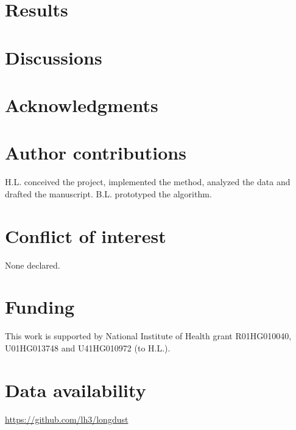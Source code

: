 \documentclass[webpdf,contemporary,large,namedate]{oup-authoring-template}%
\begin{document}
\section{Results}

\section{Discussions}

\section*{Acknowledgments}

\section*{Author contributions}

H.L. conceived the project, implemented the method, analyzed the data and drafted the manuscript.
B.L. prototyped the algorithm.

\section*{Conflict of interest}

None declared.

\section*{Funding}

This work is supported by National Institute of Health grant R01HG010040, U01HG013748 and U41HG010972 (to H.L.).

\section*{Data availability}

\url{https://github.com/lh3/longdust}


{\sffamily\small
}
\end{document}

